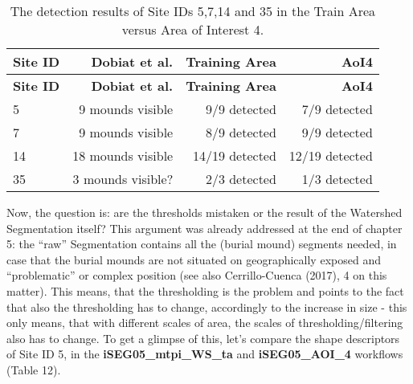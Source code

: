 \documentclass[
  12pt,
]{article}
\begin{document}
\begin{longtable}[]{@{}lrrr@{}}
\caption{The detection results of Site IDs 5,7,14 and 35 in the Train Area versus Area of Interest 4.}\tabularnewline
\toprule
\textbf{Site ID} & \textbf{Dobiat et al.} & \textbf{Training Area} & \textbf{AoI4} \\
\midrule
\endfirsthead
\toprule
\textbf{Site ID} & \textbf{Dobiat et al.} & \textbf{Training Area} & \textbf{AoI4} \\
\midrule
\endhead
5 & 9 mounds visible & 9/9 detected & 7/9 detected \\
7 & 9 mounds visible & 8/9 detected & 9/9 detected \\
14 & 18 mounds visible & 14/19 detected & 12/19 detected \\
35 & 3 mounds visible? & 2/3 detected & 1/3 detected \\
\bottomrule
\end{longtable}

Now, the question is: are the thresholds mistaken or the result of the Watershed Segmentation itself? This argument was already addressed at the end of chapter 5: the ``raw'' Segmentation contains all the (burial mound) segments needed, in case that the burial mounds are not situated on geographically exposed and ``problematic'' or complex position (see also Cerrillo-Cuenca (2017), 4 on this matter). This means, that the thresholding is the problem and points to the fact that also the thresholding has to change, accordingly to the increase in size - this only means, that with different scales of area, the scales of thresholding/filtering also has to change. To get a glimpse of this, let's compare the shape descriptors of Site ID 5, in the \textbf{iSEG05\_mtpi\_WS\_ta} and \textbf{iSEG05\_AOI\_4} workflows (Table 12).
\end{document}
